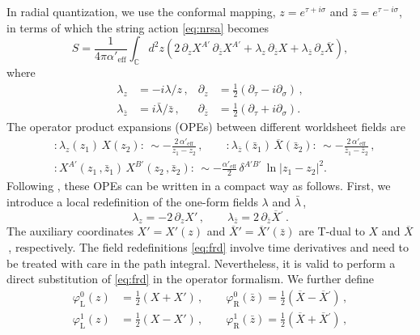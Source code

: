 \documentclass[11pt]{article}
\newcommand{\be}{\begin{equation}}
\newcommand{\ee}{\end{equation}}
\newcommand{\lr}{\left (}
\newcommand{\rr}{\right )}
\newcommand{\p}{\partial}
\begin{document}
In radial quantization, we use the conformal mapping, $z = e^{\tau + i \sigma}$ and $\bar{z} = e^{\tau - i \sigma}$, in terms of which the string action \eqref{eq:nrsa} becomes
%
\be\label{nrsacomplex}
    S = \frac{1}{4\pi\alpha'_\text{eff}} \int_\mathbb{C} d^2 z \lr 2 \, \p_z X^{A'} \, \p_{\bar{z}} X^{A'} + \lambda_z \, \p_{\bar{z}} X + \lambda_{\bar{z}} \, \p_z \overline{X} \rr,
\ee
%
where 
%
\begin{subequations} \label{eq:llpp}
\begin{align}
    \lambda_z & = - i \lambda / z\,, 
        &%
    \p_z & = \frac{1}{2}(\p_\tau-i \p_\sigma)\,, \\[2pt]
    \lambda_{\bar{z}} & = i \bar{\lambda} / \bar{z}\,, 
        &%
    \p_{\overline{z}} & = \frac{1}{2}(\p_\tau+i\p_\sigma).
\end{align}
\end{subequations}
%
The operator product expansions (OPEs) between different worldsheet fields are
%
\begin{subequations} \label{eq:opes}
\begin{align}
    & :\!\lambda_z (z_1) \, X(z_2) \!: \, \sim - \frac{2 \, \alpha'_\text{eff}}{z_1 - z_2}\,,
        \qquad
    :\! \lambda_{\bar{z}} (\bar{z}_1) \, \overline{X}(\bar{z}_2) \!: \, \sim - \frac{2 \, \alpha'_\text{eff}}{\bar{z}_{1} - \bar{z}_2}\,, \\[2pt]
    & : \! X^{A'} (z_1\,, \bar{z}_1) \, X^{B'} (z_2\,, \bar{z}_2) \!: \, \sim - \frac{\alpha'_\text{eff}}{2} \, \delta^{A'B'} \, \ln |z_{1} - z_2|^2.
\end{align}
\end{subequations}
%
Following \cite{Yan:2021lbe}, these OPEs can be written in a compact way as follows. First, we introduce a local redefinition of the one-form fields $\lambda$ and $\bar{\lambda}$\,,
%
\be \label{eq:frd}
    \lambda_z = - 2 \, \p_z X'\,,
        \qquad
    \lambda_{\bar{z}} = 2 \, \p_{\bar{z}} \overline{X}{}^\prime\,.
\ee
%
The auxiliary coordinates $X' = X'(z)$ and $\overline{X}{}' = \overline{X}{}'(\bar{z})$ are T-dual to $X$ and $\overline{X}$\,, respectively. The field redefinitions \eqref{eq:frd} involve time derivatives and need to be treated with care in the path integral. Nevertheless, it is valid to perform a direct substitution of \eqref{eq:frd} in the operator formalism. We further define
%
\begin{subequations} \label{eq:rdfp}
\begin{align}
	\varphi^0_\text{L} (z) & = \tfrac{1}{2} (X+X')\,, 
	    \qquad%
	\varphi_\text{R}^0 (\bar{z}) = \tfrac{1}{2} (\overline{X} - \overline{X}{}^\prime)\,, \\[2pt]
	\varphi^1_\text{L} (z) & = \tfrac{1}{2} (X-X')\,, 
	    \qquad%
	\varphi_\text{R}^1 (\bar{z}) = \tfrac{1}{2} (\overline{X} + \overline{X}{}^\prime)\,,
\end{align}
\end{subequations}
\end{document}
